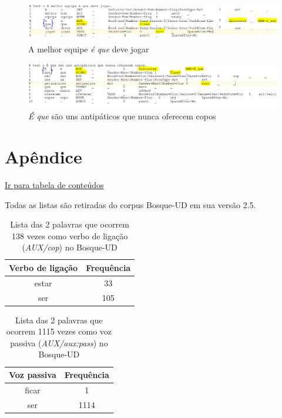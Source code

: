 \documentclass[output=paper,colorlinks,citecolor=brown]{langscibook}
\begin{document}
		\begin{figure}
    	\centering
    	\includegraphics[width=\textwidth,height=\textheight,keepaspectratio]{imagesDrive/image16.png}
    	\caption{A melhor equipe \emph{é que} deve jogar}
    	\label{fig:equeMWE2}
    	\end{figure}{}

	\begin{figure}
    	\centering
    	\includegraphics[width=\textwidth,height=\textheight,keepaspectratio]{imagesDrive/image71.PNG}
    	\caption{\emph{É que} são uns antipáticos que nunca oferecem copos}
    	\label{fig:equeMWE3}
    	\end{figure}{}

\chapter*{Apêndice}

	\hyperlink{toc}{Ir para tabela de conteúdos\\}

	Todas as listas são retiradas do corpus Bosque-UD em sua versão 2.5.
	
	\begin{table}[]
		\centering
		\begin{tabular}{|c|c|}
			\hline
			\textbf{Verbo de ligação} & \textbf{Frequência} \\\hline
			estar & 33\\\hline
			ser & 105\\\hline
		\end{tabular}
		\caption{Lista das 2 palavras que ocorrem 138 vezes como verbo de ligação (\emph{AUX/cop}) no Bosque-UD}
		\label{tab:verbosdeligacao}
	\end{table}

	\begin{table}[]
		\centering
		\begin{tabular}{|c|c|}
			\hline
			\textbf{Voz passiva} & \textbf{Frequência} \\\hline
			ficar & 1\\\hline
			ser & 1114\\\hline
		\end{tabular}
		\caption{Lista das 2 palavras que ocorrem 1115 vezes como voz passiva (\emph{AUX/aux:pass}) no Bosque-UD}
		\label{tab:vozpassiva}
	\end{table}
\end{document}
